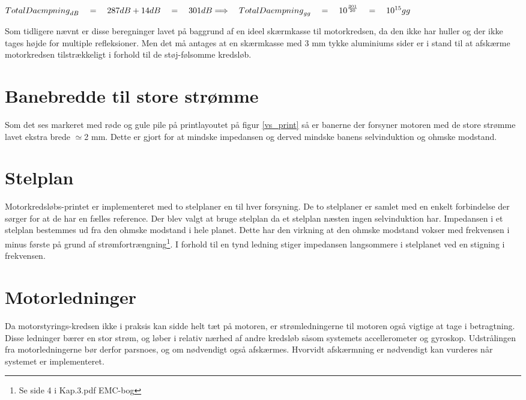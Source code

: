 ${ TotalDaempning }_{ dB }\quad =\quad 287dB+14dB\quad =\quad 301dB\\ \Longrightarrow \quad { { TotalDaempning } }_{ gg }\quad =\quad { 10 }^{ \frac { 301 }{ 20 }  }\quad =\quad { 10 }^{ 15 }gg$

Som tidligere nævnt er disse beregninger lavet på baggrund af en ideel skærmkasse til motorkredsen, da den ikke har huller og der ikke tages højde for multiple refleksioner. Men det må antages at en skærmkasse med 3 mm tykke aluminiums sider er i stand til at afskærme motorkredsen tilstrækkeligt i forhold til de støj-følsomme kredsløb.

\section{Banebredde til store strømme}

Som det ses markeret med røde og gule pile på printlayoutet på figur \ref{vs_print} så er banerne der forsyner motoren med de store strømme lavet ekstra brede $\simeq$2 mm. Dette er gjort for at mindske impedansen og derved mindske banens selvinduktion og ohmske modstand.

\section{Stelplan}

Motorkredsløbs-printet er implementeret med to stelplaner en til hver forsyning. De to stelplaner er samlet med en enkelt forbindelse der sørger for at de har en fælles reference. Der blev valgt at bruge stelplan da et stelplan næsten ingen selvinduktion har. Impedansen i et stelplan bestemmes ud fra den ohmske modstand i hele planet. Dette har den virkning at den ohmske modstand vokser med frekvensen i minus første på grund af strømfortrængning\footnote{Se side 4 i Kap.3.pdf EMC-bog}. I forhold til en tynd ledning stiger impedansen langsommere i stelplanet ved en stigning i frekvensen. 

\section{Motorledninger}

Da motorstyrings-kredsen ikke i praksis kan sidde helt tæt på motoren, er strømledningerne til motoren også vigtige at tage i betragtning. Disse ledninger bærer en stor strøm, og løber i relativ nærhed af andre kredsløb såsom systemets accellerometer og gyroskop. Udstrålingen fra motorledningerne bør derfor parsnoes, og om nødvendigt også afskærmes. Hvorvidt afskærmning er nødvendigt kan vurderes når systemet er implementeret. 
